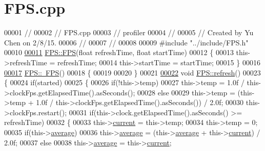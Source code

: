 \hypertarget{_f_p_s_8cpp_source}{}\section{F\+P\+S.\+cpp}
\label{_f_p_s_8cpp_source}

\begin{DoxyCode}
00001 \textcolor{comment}{//}
00002 \textcolor{comment}{//  FPS.cpp}
00003 \textcolor{comment}{//  profiler}
00004 \textcolor{comment}{//}
00005 \textcolor{comment}{//  Created by Yu Chen on 2/8/15.}
00006 \textcolor{comment}{//}
00007 \textcolor{comment}{//}
00008 
00009 \textcolor{preprocessor}{#include "../include/FPS.h"}
00010 
\hypertarget{_f_p_s_8cpp_source_l00011}{}\hyperlink{class_f_p_s_aa7155cdb7ab1a351ae797f5c137dc39c}{00011} \hyperlink{class_f_p_s_aa7155cdb7ab1a351ae797f5c137dc39c}{FPS::FPS}(\textcolor{keywordtype}{float} refreshTime, \textcolor{keywordtype}{float} startTime)
00012 \{
00013     this->refreshTime = refreshTime;
00014     this->startTime = startTime;
00015 \}
00016 
\hypertarget{_f_p_s_8cpp_source_l00017}{}\hyperlink{class_f_p_s_ae9c26e732f0773feaacd6c812db04e88}{00017} \hyperlink{class_f_p_s_ae9c26e732f0773feaacd6c812db04e88}{FPS::~FPS}()
00018 \{
00019     
00020 \}
00021 
\hypertarget{_f_p_s_8cpp_source_l00022}{}\hyperlink{class_f_p_s_aa143312d7f24775fc5d829efa3878c83}{00022} \textcolor{keywordtype}{void} \hyperlink{class_f_p_s_aa143312d7f24775fc5d829efa3878c83}{FPS::refresh}()
00023 \{
00024     \textcolor{keywordflow}{if}(started)
00025     \{
00026         \textcolor{keywordflow}{if}(!this->temp)
00027             this->temp = 1.0f / this->clockFps.getElapsedTime().asSeconds();
00028         \textcolor{keywordflow}{else}
00029             this->temp = (this->temp + 1.0f / this->clockFps.getElapsedTime().asSeconds()) / 2.0f;
00030         this->clockFps.restart();
00031         \textcolor{keywordflow}{if}(this->clock.getElapsedTime().asSeconds() >= refreshTime)
00032         \{
00033             this->\hyperlink{class_f_p_s_ada217de2ec2b66f8485fdbf70ee33675}{current} = this->temp;
00034             this->temp = 0;
00035             \textcolor{keywordflow}{if}(this->\hyperlink{class_f_p_s_a5724af794ec15040b8b101dd0c547893}{average})
00036                 this->\hyperlink{class_f_p_s_a5724af794ec15040b8b101dd0c547893}{average} = (this->\hyperlink{class_f_p_s_a5724af794ec15040b8b101dd0c547893}{average} + this->\hyperlink{class_f_p_s_ada217de2ec2b66f8485fdbf70ee33675}{current}) / 2.0f;
00037             \textcolor{keywordflow}{else}
00038                 this->\hyperlink{class_f_p_s_a5724af794ec15040b8b101dd0c547893}{average} = this->\hyperlink{class_f_p_s_ada217de2ec2b66f8485fdbf70ee33675}{current};

\end{DoxyCode}
